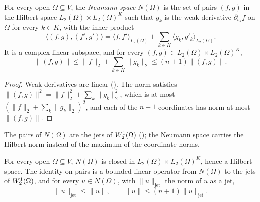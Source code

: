\begin{definition}
\label{def:neumann-space}
\leanok
{}
For every open $\Omega \subseteq V$, the \emph{Neumann space} $N(\Omega)$ is the set of pairs
$(f, g)$ in the Hilbert space $L_2(\Omega) \times L_2(\Omega)^K$ such that $g_k$ is the weak
derivative $\partial_{b_k} f$ on $\Omega$ for every $k \in K$, with the inner product
\[
  \langle (f, g), (f', g') \rangle = \langle f, f' \rangle_{L_2(\Omega)}
    + \sum_{k \in K} \langle g_k, g'_k \rangle_{L_2(\Omega)} .
\]
It is a complex linear subspace, and for every $(f, g) \in L_2(\Omega) \times L_2(\Omega)^K$,
\[
  \|(f, g)\| \leq \|f\|_2 + \sum_{k \in K} \|g_k\|_2 \leq (n + 1) \|(f, g)\| .
\]
\end{definition}

\begin{proof}
\leanok
Weak derivatives are linear (). The norm satisfies
$\|(f, g)\|^2 = \|f\|_2^2 + \sum_k \|g_k\|_2^2$, which is at most
$(\|f\|_2 + \sum_k \|g_k\|_2)^2$, and each of the $n + 1$ coordinates has norm at most
$\|(f, g)\|$.
\end{proof}

The pairs of $N(\Omega)$ are the jets of $W^{1}_{2}(\Omega)$ (); the
Neumann space carries the Hilbert norm instead of the maximum of the coordinate norms.

\begin{lemma}
\label{lem:neumann-space-closed}
\leanok
{}
For every open $\Omega \subseteq V$, $N(\Omega)$ is closed in $L_2(\Omega) \times L_2(\Omega)^K$,
hence a Hilbert space. The identity on pairs is a bounded linear operator from $N(\Omega)$ to
the jets of $W^{1}_{2}(\Omega)$, and for every $u \in N(\Omega)$, with $\|u\|_{\mathrm{jet}}$
the norm of $u$ as a jet,
\[
  \|u\|_{\mathrm{jet}} \leq \|u\|, \qquad \|u\| \leq (n + 1) \|u\|_{\mathrm{jet}} .
\]
\end{lemma}

